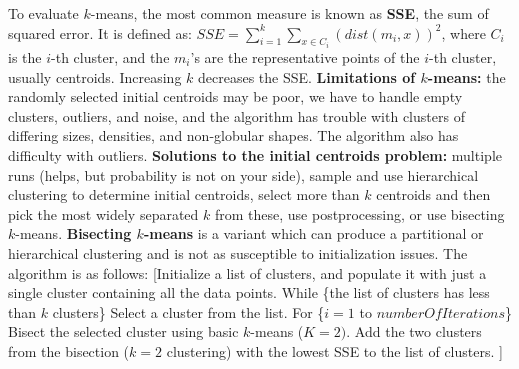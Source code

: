 \documentclass{amsbook}
\makeatletter
\theoremstyle{plain}
\theoremstyle{definition}
\theoremstyle{remark}
\newcommand{\lpar}{\left(}
\newcommand{\rpar}{\right)}
\newenvironment{restoretext}%
    {\@parboxrestore%
     \begin{adjustwidth}{}{\leftmargin}%
    }{\end{adjustwidth}
     }
\makeatother
\begin{document}
To evaluate $k$-means, the most common measure is known as \textbf{SSE}, the sum of squared error. It is defined as: $SSE = \sum_{i = 1}^k \sum_{x \in C_i}\lpar dist(m_i,x) \rpar^2$, where $C_i$ is the $i$-th cluster, and the $m_i$'s are the representative points of the $i$-th cluster, usually centroids. Increasing $k$ decreases the SSE. \textbf{Limitations of $k$-means: }the randomly selected initial centroids may be poor, we have to handle empty clusters, outliers, and noise, and the algorithm has trouble with clusters of differing sizes, densities, and non-globular shapes. The algorithm also has difficulty with outliers. \textbf{Solutions to the initial centroids problem: }multiple runs (helps, but probability is not on your side), sample and use hierarchical clustering to determine initial centroids, select more than $k$ centroids and then pick the most widely separated $k$ from these, use postprocessing, or use bisecting $k$-means. \textbf{Bisecting $k$-means} is a variant which can produce a partitional or hierarchical clustering and is not as susceptible to initialization issues. The algorithm is as follows: [Initialize a list of clusters, and populate it with just a single cluster containing all the data points.  
While \{the list of clusters has less than $k$ clusters\}
	Select a cluster from the list.
	For \{$i = 1$ to $numberOfIterations$\}
		Bisect the selected cluster using basic $k$-means ($K = 2)$. Add the two clusters from the bisection ($k = 2$ clustering) with the lowest SSE to the list of clusters. ]
\begin{comment}
\begin{restoretext}
\begin{algorithm}[H]\label{alg1}
Initialize a list of clusters, and populate it with just a single cluster containing all the data points.  \\
\While{the list of clusters has less than $k$ clusters}{
	Select a cluster from the list.\\
	\For{$i = 1$ to $numberOfIterations$}{
		Bisect the selected cluster using basic $k$-means ($K = 2)$.  
	} 
	Add the two clusters from the bisection ($k = 2$ clustering) with the lowest SSE to the list of clusters. 
}
\caption{Bisecting$(k)$}
\end{algorithm}
\end{restoretext}
\end{comment}
\end{document}
